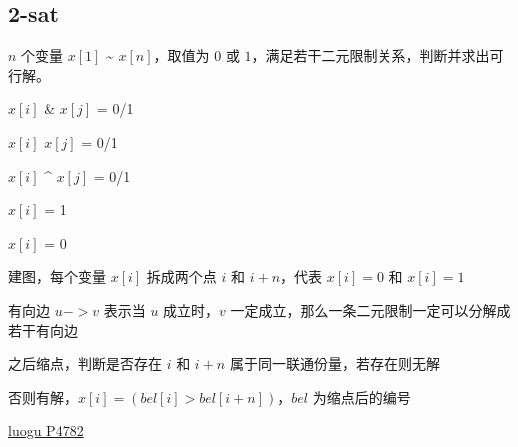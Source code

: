 \documentclass[
]{article}
\begin{document}
\hypertarget{sat}{%
\subsection{2-sat}\label{sat}}

\(n\) 个变量 \(x[1]\) \textasciitilde{} \(x[n]\)，取值为 \(0\) 或
\(1\)，满足若干二元限制关系，判断并求出可行解。

\(x[i]\) \& \(x[j]\) = 0/1

\(x[i]\) \textbar{} \(x[j]\) = 0/1

\(x[i]\) \^{} \(x[j]\) = 0/1

\(x[i]\) = 1

\(x[i]\) = 0

建图，每个变量 \(x[i]\) 拆成两个点 \(i\) 和 \(i+n\)，代表 \(x[i]=0\) 和
\(x[i]=1\)

有向边 \(u -> v\) 表示当 \(u\) 成立时，\(v\)
一定成立，那么一条二元限制一定可以分解成若干有向边

之后缩点，判断是否存在 \(i\) 和 \(i+n\) 属于同一联通份量，若存在则无解

否则有解，\(x[i] = (bel[i]>bel[i+n])\)，\(bel\) 为缩点后的编号

\href{https://www.luogu.com.cn/problem/P4782}{luogu P4782}
\end{document}
